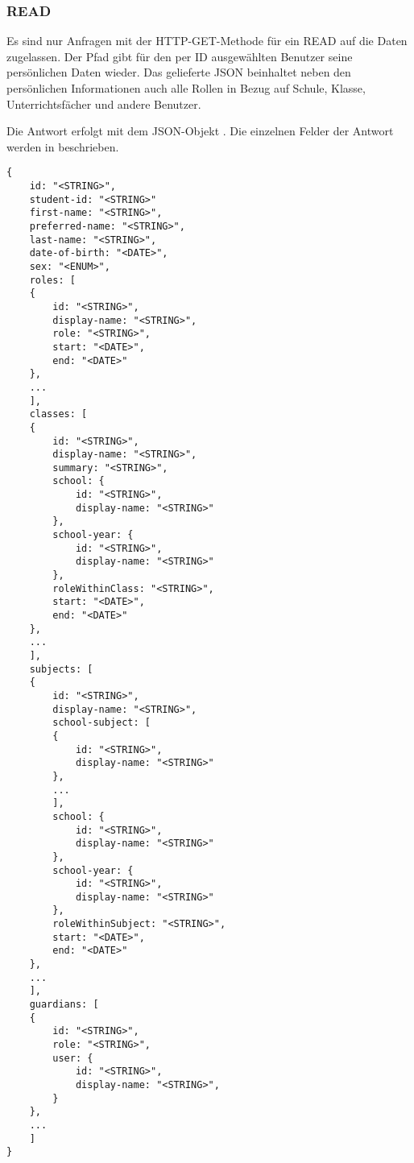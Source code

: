 \subsubsection{READ}
\label{sec:rest:api:users:id:read}
Es sind nur Anfragen mit der HTTP-GET-Methode für ein READ auf die Daten zugelassen.
Der Pfad gibt für den per ID ausgewählten Benutzer seine persönlichen Daten wieder. Das gelieferte JSON beinhaltet neben den persönlichen Informationen auch alle Rollen in Bezug auf Schule, Klasse, Unterrichtsfächer und andere Benutzer.

Die Antwort erfolgt mit dem JSON-Objekt . 
Die einzelnen Felder der Antwort werden in  beschrieben.

\begin{lstlisting}[caption={JSON-Antwort für einen GET-Aufruf des Pfads /api/users/\$id},label={lst:code:rest:api:users:id:read:ret},frame=tlrb]
{
	id: "<STRING>",
	student-id: "<STRING>"
 	first-name: "<STRING>",
 	preferred-name: "<STRING>",
 	last-name: "<STRING>",
 	date-of-birth: "<DATE>",
 	sex: "<ENUM>",
 	roles: [
 	{
 		id: "<STRING>",
 		display-name: "<STRING>",
 		role: "<STRING>",
 		start: "<DATE>",
 		end: "<DATE>"
 	},
 	...
 	],
 	classes: [
 	{
 		id: "<STRING>",
 		display-name: "<STRING>",
 		summary: "<STRING>",
 		school: {
 			id: "<STRING>",
 			display-name: "<STRING>"
 		},
 		school-year: {
 			id: "<STRING>",
 			display-name: "<STRING>"
 		},
 		roleWithinClass: "<STRING>",
 		start: "<DATE>",
 		end: "<DATE>"
 	},
 	...
	],
	subjects: [
	{
		id: "<STRING>",
		display-name: "<STRING>",
		school-subject: [
 		{
 			id: "<STRING>",
 			display-name: "<STRING>"
 		},
 		...
 		],
 		school: {
 			id: "<STRING>",
 			display-name: "<STRING>"
 		},
 		school-year: {
 			id: "<STRING>",
 			display-name: "<STRING>"
 		},
 		roleWithinSubject: "<STRING>",
 		start: "<DATE>",
 		end: "<DATE>" 		
	},
	...
	],
	guardians: [
	{
		id: "<STRING>",
		role: "<STRING>",
		user: {
			id: "<STRING>",
			display-name: "<STRING>",
		}
	},
	...
	]
}
\end{lstlisting}

